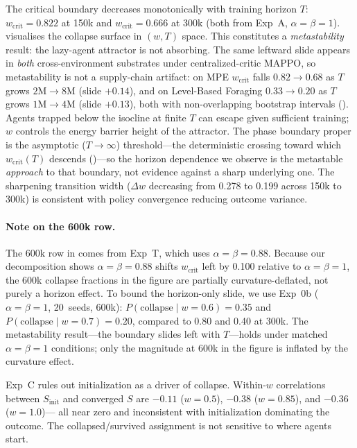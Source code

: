 \documentclass[letterpaper]{article}
\theoremstyle{plain}
\newcommand{\wcrit}{w_{\mathrm{crit}}}
\begin{document}
The critical boundary decreases monotonically with training horizon $T$:
$\wcrit = 0.822$ at 150k and $\wcrit = 0.666$ at 300k (both from Exp~A,
$\alpha{=}\beta{=}1$).
 visualises the collapse surface in $(w, T)$ space.
This constitutes a \emph{metastability} result: the lazy-agent attractor
is not absorbing.
The same leftward slide appears in \emph{both} cross-environment substrates under
centralized-critic MAPPO, so metastability is not a supply-chain artifact: on MPE
$\wcrit$ falls $0.82\!\to\!0.68$ as $T$ grows $2\mathrm{M}\!\to\!8\mathrm{M}$
(slide $+0.14$), and on Level-Based Foraging $0.33\!\to\!0.20$ as
$T$ grows $1\mathrm{M}\!\to\!4\mathrm{M}$ (slide $+0.13$), both with
non-overlapping bootstrap intervals ().
Agents trapped below the isocline at finite $T$ can escape given
sufficient training; $w$ controls the energy barrier height of the
attractor.
The phase boundary proper is the asymptotic ($T\!\to\!\infty$) threshold---the
deterministic crossing toward which $\wcrit(T)$ descends ()---so
the horizon dependence we observe is the metastable \emph{approach} to that
boundary, not evidence against a sharp underlying one.
The sharpening transition width ($\Delta w$ decreasing from 0.278 to
0.199 across 150k to 300k) is consistent with policy convergence reducing
outcome variance.

\paragraph{Note on the 600k row.}
The 600k row in  comes from Exp~T, which uses
$\alpha{=}\beta{=}0.88$.
Because our decomposition shows $\alpha{=}\beta{=}0.88$ shifts
$\wcrit$ left by 0.100 relative to $\alpha{=}\beta{=}1$, the 600k
collapse fractions in the figure are partially curvature-deflated, not
purely a horizon effect.
To bound the horizon-only slide, we use Exp~0b ($\alpha{=}\beta{=}1$,
20~seeds, 600k): $P(\mathrm{collapse}\mid w{=}0.6) = 0.35$ and
$P(\mathrm{collapse}\mid w{=}0.7) = 0.20$, compared to 0.80 and 0.40
at 300k.
The metastability result---the boundary slides left with $T$---holds
under matched $\alpha{=}\beta{=}1$ conditions; only the magnitude at
600k in the figure is inflated by the curvature effect.

Exp~C rules out initialization as a driver of collapse.
Within-$w$ correlations between $S_{\mathrm{init}}$ and converged $S$
are $-0.11$ ($w{=}0.5$), $-0.38$ ($w{=}0.85$), and $-0.36$ ($w{=}1.0$)---
all near zero and inconsistent with initialization dominating the outcome.
The collapsed/survived assignment is not sensitive to where agents start.
\end{document}
